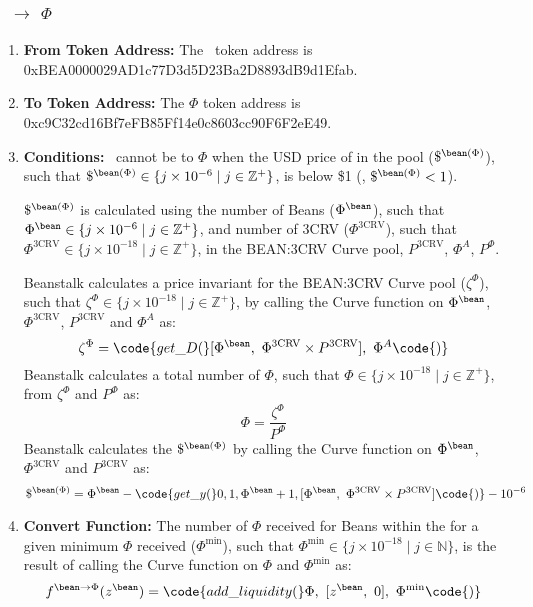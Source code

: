 \documentclass[class=article, crop=false]{standalone}
\begin{document}
\subsubsection{\Bean\ $\rightarrow$ $\Phi$}
    \begin{enumerate}
        \item \textbf{From Token Address:} The \Bean\ token address is 0xBEA0000029AD1c77D3d5D23Ba2D8893dB9d1Efab.
        \item \textbf{To Token Address:} The $\Phi$ token address is 0xc9C32cd16Bf7eFB85Ff14e0c8603cc90F6F2eE49.
        \item \textbf{Conditions:}  \Bean\ cannot be  to  $\Phi$ when the USD price of  in the pool ($\$^{\bean(\Phi)}$), such that $\$^{\bean(\Phi)}\in \{j \times 10^{-6} \mid j \in \mathbb{Z}^{+} \}$, is below \$1 (, $\$^{\bean(\Phi)} < 1$). 

$\$^{\bean(\Phi)}$ is calculated using the number of Beans ($\Phi^{\bean}$), such that $\Phi^{\bean} \in \{j \times 10^{-6} \mid j \in \mathbb{Z}^{+} \}$, and number of 3CRV ($\Phi^{\text{3CRV}}$), such that $\Phi^{\text{3CRV}} \in \{j \times 10^{-18} \mid j \in \mathbb{Z}^{+} \}$, in the BEAN:3CRV Curve pool, $P^{\text{3CRV}}$, $\Phi^{A}$, $P^{\Phi}$. 

Beanstalk calculates a price invariant for the BEAN:3CRV Curve pool ($\zeta^{\Phi}$), such that $\zeta^{\Phi}\in \{j \times 10^{-18} \mid j \in \mathbb{Z}^{+} \}$, by calling the Curve  function on $\Phi^{\bean}$, $\Phi^{\text{3CRV}}$, $P^{\text{3CRV}}$ and $\Phi^{A}$ as:
$$\zeta^{\Phi} = \code{get\_D(}[\Phi^{\bean},\ \Phi^{\text{3CRV}} \times P^{\text{3CRV}}],\ \Phi^{A}\code{)}$$
Beanstalk calculates a total number of $\Phi$, such that $\Phi\in \{j \times 10^{-18} \mid j \in \mathbb{Z}^{+} \}$, from $\zeta^{\Phi}$ and $P^{\Phi}$ as:
$$\Phi = \frac{\zeta^{\Phi}}{P^{\Phi}}$$
Beanstalk calculates the $\$^{\bean(\Phi)}$ by calling the Curve  function on $\Phi^{\bean}$, $\Phi^{\text{3CRV}}$ and $P^{\text{3CRV}}$ as:
$$\$^{\bean(\Phi)} =  \Phi^{\bean} - \code{get\_y(}0, 1, \Phi^{\bean} + 1, [\Phi^{\bean},\ \Phi^{\text{3CRV}} \times P^{\text{3CRV}}]\code{)} - 10^{-6}$$
        \item \textbf{Convert Function:} The number of $\Phi$ received for   Beans within the  for a given minimum $\Phi$ received ($\Phi^{\text{min}}$), such that $\Phi^{\text{min}} \in \{j \times 10^{-18} \mid j \in \mathbb{N} \}$, is the result of calling the Curve  function on $\Phi$ and $\Phi^{\text{min}}$ as:
$$f^{\bean \rightarrow \Phi}(z^{\bean}) = \code{add\_liquidity(} \Phi,\ [z^{\bean},\ 0],\ \Phi^{\text{min}} \code{)}$$
    \end{enumerate}
\end{document}
